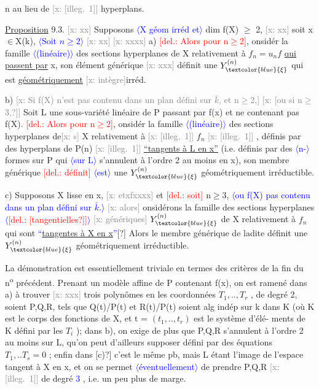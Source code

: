 \documentclass[11pt]{article}
\newcommand{\scanpage}[1]{\par\bigskip\noindent{\small\sffamily[scan #1]}\par}
\newcommand{\mspage}[1]{{\small\sffamily[p.\,#1]}}
\newcommand{\hand}[1]{\textcolor{blue}{#1}}
\let\over\relax
\newcommand{\over}[2]{\textcolor{gray}{#1}\textcolor{blue}{\ensuremath{^{\!\nearrow}}#2}}
\newcommand{\inserted}[2][]{\textcolor{blue}{$\langle$#2$\rangle$}}
\newcommand{\deleted}[1]{\textcolor{red}{[\textsf{del.:} #1]}}
\newcommand{\xout}[1]{\textcolor{gray}{[\textsf{x:} #1]}}
\newcommand{\uline}[1]{\underline{#1}}
\newcommand{\unsure}[1]{[#1?]}
\newcommand{\illegible}[1]{[\textsf{illeg.\ #1}]}
\begin{document}
\clearpage
\scanpage{25/56}
\mspage{51}

n  au lieu de \xout{\illegible{1}} hyperplans.

\uline{Proposition} 9.3. \xout{xx} Supposons \inserted{X géom irréd et} dim f(X) $\geq$ 2, \xout{xx} soit x$\in$X(k), \inserted{Soit $n\geq 2$} \xout{xx}
\xout{xxxx} a) \deleted{Alors pour n$\geq$2}, \over{c}{C}onsidér\over{ant}{ons} la famille \inserted{(linéaire)} des sections hyperplanes
de X relativement à $f_n=u_nf$ \uline{qui passent par} x, son élément
générique \xout{xxx} définit une $Y^{(n)}_{\hand{\xi}}$ qui est \uline{géométriquement} \xout{intègre}irréd.

b) \xout{Si f(X) n'est pas contenu dans un plan défini sur $\bar{k}$, et n$\geq$2,}
\xout{\unsure{ou si n$\geq$3,}} Soit L une sous-variété linéaire de P passant par f(x) et
ne contenant pas f(X). \deleted{Alors pour n$\geq$2}, \over{c}{C}onsidér\over{ant}{ons} la famille \inserted{(linéaire)} des
sections hyperplanes de\xout{s} X relativement à \xout{\illegible{1}} $f_n$ \xout{\illegible{1}} , définis
par des hyperplans de P(n) \xout{\illegible{1}} \uline{``tangents à L en x''} (i.e. définis
par des \inserted{n-}formes sur P qui \inserted{sur L} s'annulent à l'ordre 2 au moins en x), son
membre générique \deleted{définit} \inserted{est} une $Y^{(n)}_{\hand{\xi}}$ géométriquement irréductible.

c) Supposons X lisse en x, \xout{etxfxxxx} et \deleted{soit} n$\geq$3, \inserted{ou f(X) pas contenu dans un plan défini sur $\bar{k}$.} \xout{alors} \over{c}{C}onsidérons
la famille des sections hyperplanes \inserted{\deleted{\unsure{tangentielles}}} \xout{génériques} $Y^{(n)}_{\hand{\xi}}$ de X relativement
à $f_n$ qui sont \hand{``}\uline{tangentes à X en x}\hand{''}\unsure{\over{.}{,}} Alors le membre générique de ladite
définit une $Y^{(n)}_{\hand{\xi}}$ géométriquement irréductible.

La démonstration est essentiellement triviale en termes des
critères de la fin du n\textsuperscript{o} précédent. Prenant un modèle affine de P
contenant f(x), on est ramené dans a) à trouver \xout{xxx} trois polynômes
en les coordonnées $T_1,..,T_r$ , de degré \over{\illegible{1}}{$\leq$}2, soient P,Q,R, tels que
Q(t)/P(t) et R(t)/P(t) soient alg indép sur k dans K (où K est le
corps des fonctions de X, et t = $(t_1,..,t_r)$ est le système d'élé-%
ments de K défini par les $T_i$ ); dans b), on exige de plus que P,Q,R
s'annulent à l'ordre 2 au moins sur L, qu'on peut d'ailleurs supposer
défini par des équations $T_1,..T_s = 0$ ; enfin dans \unsure{c)} c'est le même
pb, mais L étant l'image de l'espace tangent à X en x, et on se permet
\inserted{éventuellement} de prendre P,Q,R \xout{\illegible{1}} de degré \hand{3} , i.e. un peu plus de marge.
\end{document}
